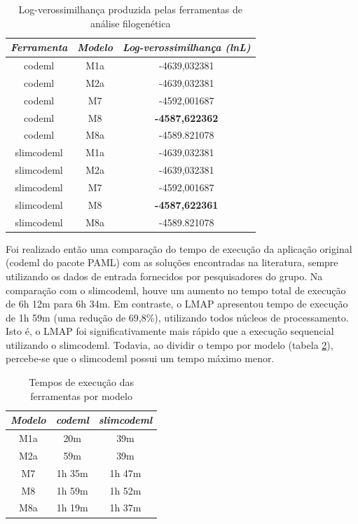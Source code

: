 \documentclass[cic,tc]{iiufrgs}
\begin{document}
\begin{table}[h]
    \caption{Log-verossimilhança produzida pelas ferramentas de análise filogenética}
    \centering
        \begin{tabular}{c|c|c}
          \hline
          \textit{Ferramenta}  &   \textit{Modelo} & \textit{Log-verossimilhança (lnL)} \\
          \hline
          \hline
          codeml            & M1a & -4639,032381 \\
          codeml            & M2a & -4639,032381 \\
          codeml            & M7  & -4592,001687 \\
          codeml            & M8  & \textbf{-4587,622362} \\
          codeml            & M8a & -4589.821078 \\
          slimcodeml        & M1a & -4639,032381 \\
          slimcodeml        & M2a & -4639,032381 \\
          slimcodeml        & M7  & -4592,001687 \\
          slimcodeml        & M8  & \textbf{-4587,622361} \\
          slimcodeml        & M8a & -4589.821078 \\
          \hline
        \end{tabular}
    \label{tbl:log}
\end{table}

Foi realizado então uma comparação do tempo de execução da aplicação original
(codeml do pacote PAML) com as soluções encontradas na literatura, sempre
utilizando os dados de entrada fornecidos por pesquisadores do grupo. Na
comparação com o slimcodeml, houve um aumento no tempo total de execução de 6h
12m para 6h 34m. Em contraste, o LMAP apresentou tempo de execução de 1h 59m
(uma redução de 69,8\%), utilizando todos núcleos de processamento. Isto é, o
LMAP foi significativamente mais rápido que a execução sequencial utilizando o
slimcodeml. Todavia, ao dividir o tempo por modelo (tabela
\ref{tbl:pamstages}), percebe-se que o slimcodeml possui um tempo máximo menor.

\begin{table}[h]
    \caption{Tempos de execução das ferramentas por modelo}
    \centering
        \begin{tabular}{c|c|c}
          \hline
          \textit{Modelo}  & \textit{codeml} & \textit{slimcodeml} \\
          \hline
          \hline
          M1a & 20m    & 39m   \\
          M2a & 59m    & 39m    \\
          M7  & 1h 35m & 1h 47m \\
          M8  & 1h 59m & 1h 52m \\
          M8a & 1h 19m & 1h 37m \\
          \hline
        \end{tabular}
    \label{tbl:pamstages}
\end{table}
\end{document}
